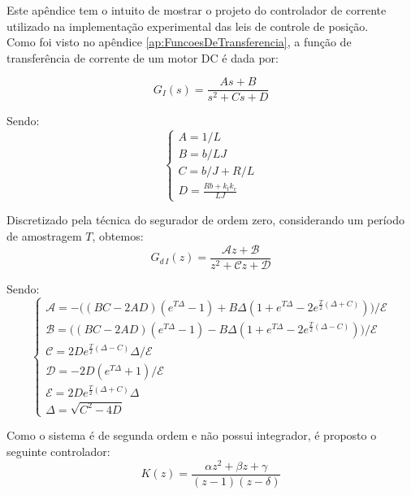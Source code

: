\documentclass[]{politex}
\begin{document}
Este apêndice tem o intuito de mostrar o projeto do controlador de corrente utilizado na implementação experimental das leis de controle de posição. \\

Como foi visto no apêndice \ref{ap:FuncoesDeTransferencia}, a função de transferência de corrente de um motor DC é dada por:

\begin{equation} \label{functionTransferMotorCorrente}
G_{I}(s) = \frac{A s+B}{s^2 + C s + D}
\end{equation}

Sendo:
\begin{equation}
\begin{cases}
A = 1/L \\
B = b/LJ \\
C = b/J + R/L \\
D = \frac{Rb + k_t k_e}{LJ}
\end{cases}
\end{equation}

Discretizado pela técnica do segurador de ordem zero, considerando um período de amostragem $T$, obtemos:
\begin{equation}
G_{d\,I}(z) = \frac{\mathcal{A} z + \mathcal{B}}{z^2 + \mathcal{C} z + \mathcal{D}}
\end{equation}

Sendo:
\begin{equation}
\begin{cases}
\mathcal{A} = -  \Big( (BC - 2AD)(e^{T \Delta} -1) + B \Delta (1 + e^{T \Delta} - 2 e^{\frac{T}{2}(\Delta+C)} ) \Big) / \mathcal{E}\\
\mathcal{B} =   \Big( (BC - 2AD)(e^{T \Delta} -1) - B \Delta (1 + e^{T \Delta} - 2 e^{\frac{T}{2}(\Delta-C)} ) \Big) / \mathcal{E} \\
\mathcal{C} = 2 D  e^{\frac{T}{2}  (\Delta - C )} \Delta / \mathcal{E} \\
\mathcal{D} = -2 D  \left(e^{T \Delta}+1\right) / \mathcal{E} \\
\mathcal{E} = 2 D  e^{\frac{T}{2}(\Delta + C)} \Delta \\
\Delta = \sqrt{C^2 - 4D}
\end{cases}
\end{equation}

Como o sistema é de segunda ordem e não possui integrador, é proposto o seguinte controlador:
\begin{equation}
K(z) = \frac{\alpha z^2 + \beta z + \gamma}{(z-1)(z-\delta)}
\end{equation}
\end{document}
